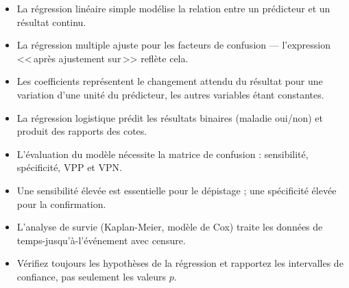 \begin{itemize}
  \item La r\'egression lin\'eaire simple mod\'elise la relation entre un pr\'edicteur et un r\'esultat continu.
  \item La r\'egression multiple ajuste pour les facteurs de confusion --- l'expression <<\,apr\`es ajustement sur\,>> refl\`ete cela.
  \item Les coefficients repr\'esentent le changement attendu du r\'esultat pour une variation d'une unit\'e du pr\'edicteur, les autres variables \'etant constantes.
  \item La r\'egression logistique pr\'edit les r\'esultats binaires (maladie oui/non) et produit des rapports des cotes.
  \item L'\'evaluation du mod\`ele n\'ecessite la matrice de confusion : sensibilit\'e, sp\'ecificit\'e, VPP et VPN.
  \item Une sensibilit\'e \'elev\'ee est essentielle pour le d\'epistage ; une sp\'ecificit\'e \'elev\'ee pour la confirmation.
  \item L'analyse de survie (Kaplan-Meier, mod\`ele de Cox) traite les donn\'ees de temps-jusqu'\`a-l'\'ev\'enement avec censure.
  \item V\'erifiez toujours les hypoth\`eses de la r\'egression et rapportez les intervalles de confiance, pas seulement les valeurs $p$.
\end{itemize}

